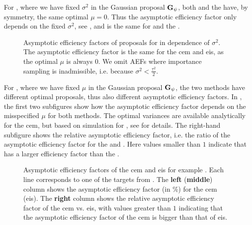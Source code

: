 For , where we have fixed $\sigma^{2}$ in the Gaussian proposal $\mathbf G_{\psi}$, both \aeis and the \acem have, by symmetry, the same optimal $\mu = 0$. Thus the asymptotic efficiency factor only depends on the fixed $\sigma^{2}$, see , and is the same for \aeis and the \acem.

\begin{figure}
    \centering
    \resizebox{\textwidth}{!}{%
    }
    \caption{Asymptotic efficiency factors of proposals for  in dependence of $\sigma^{2}$. The asymptotic efficiency factor is the same for the \gls{cem} and \gls{eis}, as the optimal $\mu$ is always $0$. We omit AEFs where importance sampling is inadmissible, i.e. because $\sigma^{2} < \frac{\tau^{2}}{2}$.}
    \label{fig:rho_mu}

\end{figure}

For , where we have fixed $\mu$ in the Gaussian proposal $\mathbf G_{\psi}$, the two methods have different optimal proposals, thus also different asymptotic efficiency factors. In , the first two subfigures show how the asymptotic efficiency factor depends on the misspecified $\mu$ for both methods. The optimal variances are available analytically for the \gls{cem}, but based on simulation for \aeis, see  for details. The right-hand subfigure shows the relative asymptotic efficiency factor, i.e. the ratio of the asymptotic efficiency factor for the \acem and \aeis. Here values smaller than $1$ indicate that \aeis has a larger efficiency factor than the \acem. 

\begin{figure}
    \centering

    \resizebox{\textwidth}{!}{%
    }
    \caption{Asymptotic efficiency factors of the \gls{cem} and \gls{eis} for example . Each line corresponds to one of the targets from . The \textbf{left} (\textbf{middle}) column shows the asymptotic efficiency factor (in \%) for the \gls{cem} (\gls{eis}). The \textbf{right} column shows the relative asymptotic efficiency factor of the \gls{cem} vs. \gls{eis}, with values greater than $1$ indicating that the asymptotic efficiency factor of the \gls{cem} is bigger than that of \gls{eis}.} 
    \label{fig:rho}
\end{figure} 

